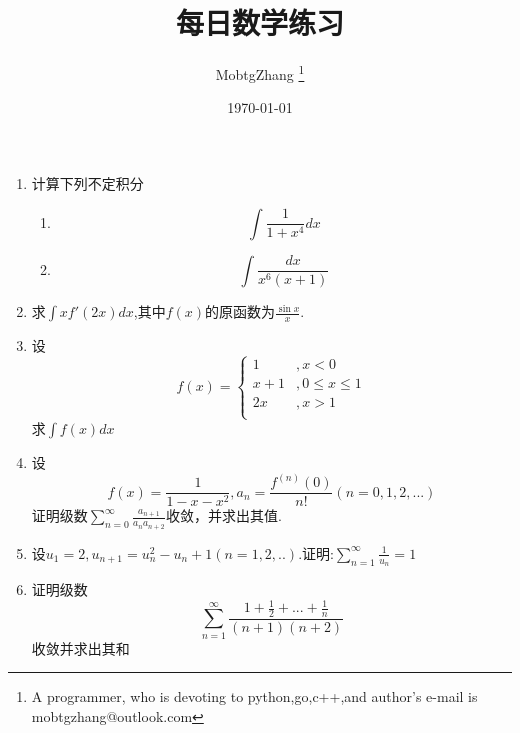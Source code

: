 \documentclass[UTF8,a4paper,10pt]{ctexart}
\title{每日数学练习}
\author{ MobtgZhang \thanks{A programmer, who is devoting to python,go,c++,and author's e-mail is mobtgzhang@outlook.com} }
\date{\today}
\begin{document}
	\maketitle
	\thispagestyle{fancy}
	\begin{flushleft}
		\begin{enumerate}
			\item 计算下列不定积分
			\begin{enumerate}
				\item 
				\begin{equation}
					\int\frac{1}{1+x^{4}}dx \nonumber
				\end{equation}
				\item
				\begin{equation}
					\int\frac{dx}{x^{6}(x+1)}\nonumber
				\end{equation}
			\end{enumerate}
			\item 求$\int{xf{'}(2x)}dx$,其中$f(x)$的原函数为$\frac{\sin{x}}{x}$.
			\item 设
				\begin{equation}
					f(x)=\begin{cases}
						1&,x<0\\
						x+1&,0\leq{x}\leq{1}\\
						2x&,x>1\\
					\end{cases}\nonumber
				\end{equation}
				求$\int{f(x)}dx$
			\item 设
				\begin{equation}
					f(x)=\frac{1}{1-x-x^{2}},a_{n}=\frac{f^{(n)}(0)}{n!}(n=0,1,2,...)\nonumber
				\end{equation}
				证明级数$\sum\limits_{n=0}^{\infty}\frac{a_{n+1}}{a_{n}a_{n+2}}$收敛，并求出其值.
			\item 设$u_{1}=2,u_{n+1}=u_{n}^{2}-u_{n}+1(n=1,2,..)$.证明:$\sum\limits_{n=1}^{\infty}\frac{1}{u_{n}}=1$
			\item 证明级数
				\begin{equation}
					\sum\limits_{n=1}^{\infty}\frac{1+\frac{1}{2}+...+\frac{1}{n}}{(n+1)(n+2)}\nonumber
				\end{equation}
				收敛并求出其和
		\end{enumerate}
	\end{flushleft}
\end{document}
